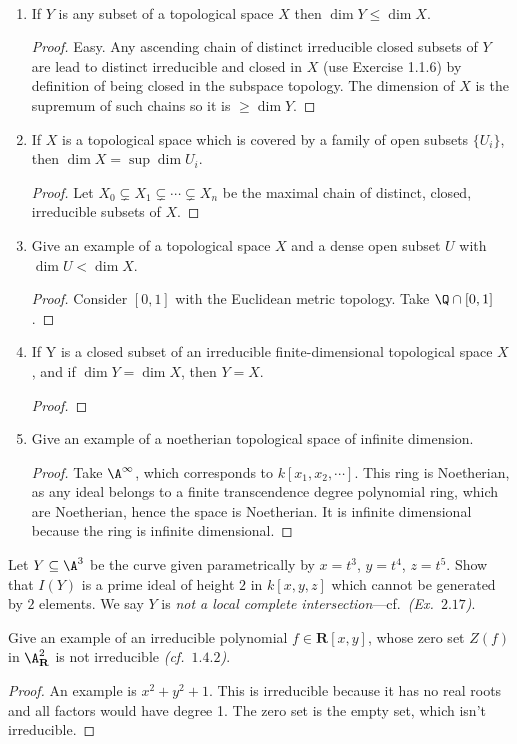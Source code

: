 \documentclass[openany, amssymb, psamsfonts]{amsart}
\begin{document}
\begin{exercise}%
~
\begin{enumerate}
\item If $Y$ is any subset of a topological space $X$ then $\dim Y \leq \dim X$. 
\begin{proof}
	Easy. Any ascending chain of distinct irreducible closed subsets of $Y $ are lead to distinct irreducible and closed in $X$ (use Exercise 1.1.6) by definition of being closed in the subspace topology.
	The dimension of $X $ is the supremum of such chains so it is $\ge \dim Y $.
\end{proof}
\item If $X$ is a topological space which is covered by a family of open subsets $\{U_{i}\}$, then $\dim X = \sup \dim U_i$.
\begin{proof}
	Let $X_{0}\subsetneq X_{1}\subsetneq \cdots \subsetneq X_n $ be the maximal chain of distinct, closed, irreducible subsets of $X $.
\end{proof}
\item Give an example of a topological space $X$ and a dense open subset $U$ with $\dim U < \dim X$. 
\begin{proof}
	Consider $[0,1] $ with the Euclidean metric topology.
	Take $\Q\cap [0,1] $.
\end{proof}
\item If Y is a closed subset of an irreducible finite-dimensional topological space $X$, and if $\dim Y = \dim X$, then $Y= X$. 
\begin{proof}
\end{proof}
\item Give an example of a noetherian topological space of infinite dimension.  
\begin{proof}
	Take $\A^\infty $, which corresponds to $k[x_{1},x_{2},\cdots] $.
	This ring is Noetherian, as any ideal belongs to a finite transcendence degree polynomial ring, which are Noetherian, hence the space is Noetherian.
	It is infinite dimensional because the ring is infinite dimensional.
\end{proof}
\end{enumerate}
\end{exercise}

\begin{exercise}%
Let $Y \subseteq \A^3$ be the curve given parametrically by $x = t^3$, $y= t^4$, $z = t^5$. Show that $I(Y)$ is a prime ideal of height $2$ in $k[x,y,z]$ which cannot be generated by $2$ elements. We say $Y$ is \emph{not a local complete intersection}---cf.~\emph{(Ex.~$2.17$)}. 
\end{exercise}

\begin{exercise}%
Give an example of an irreducible polynomial $f \in \mathbf{R}[x,y]$, whose zero set $Z(f)$ in $\A_{\mathbf{R}}^2$ is not irreducible
\emph{(cf.~$1.4.2$)}.
\end{exercise}
\begin{proof}
	An example is $x^2+y^2+1 $.
	This is irreducible because it has no real roots and all factors would have degree 1.
	The zero set is the empty set, which isn't irreducible.
\end{proof}
\end{document}
